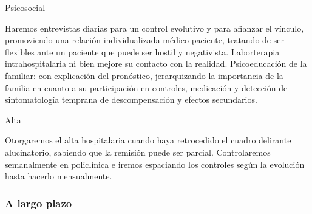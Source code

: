 Psicosocial

Haremos entrevistas diarias para un control evolutivo y para afianzar el vínculo, promoviendo una relación individualizada médico-paciente, tratando de ser flexibles ante un paciente que puede ser hostil y negativista. Laborterapia intrahospitalaria ni bien mejore su contacto con la realidad. Psicoeducación de la familiar: con explicación del pronóstico, jerarquizando la importancia de la familia en cuanto a su participación en controles, medicación y detección de sintomatología temprana de descompensación y efectos secundarios.

Alta

Otorgaremos el alta hospitalaria cuando haya retrocedido el cuadro delirante alucinatorio, sabiendo que la remisión puede ser parcial. Controlaremos semanalmente en policlínica e iremos espaciando los controles según la evolución hasta hacerlo mensualmente.

\subsubsection*{A largo plazo}
